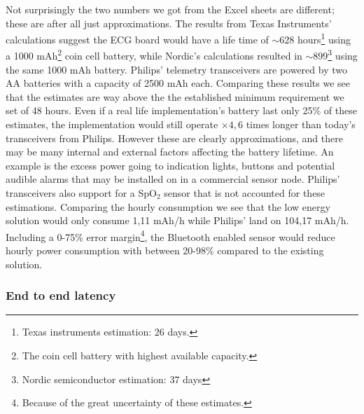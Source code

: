 Not surprisingly the two numbers we got from the Excel sheets are different; these are after all just approximations. The results from Texas Instruments' calculations suggest the ECG board would have a life time of $\sim628$ hours\footnote{ Texas instruments estimation: 26 days.} using a 1000 mAh\footnote{ The coin cell battery with highest available capacity.} coin cell battery, while Nordic's calculations resulted in $\sim899$\footnote{ Nordic semiconductor estimation: 37 days} using the same 1000 mAh battery. Philips' telemetry transceivers are powered by two AA batteries with a capacity of 2500 mAh each. Comparing these results we see that the estimates are way above the the established minimum requirement we set of 48 hours. Even if a real life implementation's battery last only 25\% of these estimates, the implementation would still operate $\times 4,6$ times longer than today's transceivers from Philips. However these are clearly approximations, and there may be many internal and external factors affecting the battery lifetime. An example is the excess power going to indication lights, buttons and potential audible alarms that may be installed on in a commercial sensor node. Philips' transceivers also support for a SpO$_2$ sensor that is not accounted for these estimations. Comparing the hourly consumption we see that the low energy solution would only consume 1,11 mAh/h while Philips' land on 104,17 mAh/h. Including a 0-75\% error margin\footnote{ Because of the great uncertainty of these estimates.}, the Bluetooth enabled sensor would reduce hourly power consumption with between 20-98\% compared to the existing solution.


\subsubsection{End to end latency} %
\label{ssub:end_to_end_latency}

